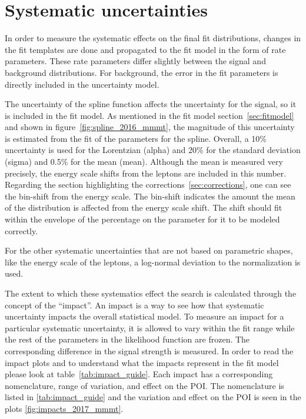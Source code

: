 \section{Systematic uncertainties}
In order to measure the systematic effects on the final fit distributions, changes in the fit templates are done and propagated to the fit model in the form of rate parameters. These rate parameters differ slightly between the signal and background distributions. 
For background, the error in the fit parameters is directly included in the uncertainty model. 

The uncertainty of the spline function affects the uncertainty for the signal, so it is included in the fit model. 
As mentioned in the fit model section~\ref{sec:fitmodel} and shown in figure~\ref{fig:spline_2016_mmmt}, the magnitude of this uncertainty is estimated from the fit of the parameters for the spline. Overall, a 10\% uncertainty is used for the Lorentzian (alpha) and 20\% for the standard deviation (sigma) and 0.5\% for the mean (mean). Although the mean is measured very precisely, the energy scale shifts from the leptons are included in this number. Regarding the section highlighting the corrections~\ref{sec:corrections}, one can see the bin-shift from the energy scale. The bin-shift indicates the amount the mean of the distribution is affected from the energy scale shift. The shift should fit within the envelope of the percentage on the parameter for it to be modeled correctly.


For the other systematic uncertainties that are not based on parametric shapes, like the energy scale of the leptons, a log-normal deviation to the normalization is used. 

The extent to which these systematics effect the search is calculated through the concept of the ``impact''. An impact is a way to see how that systematic uncertainty impacts the overall statistical model. To measure an impact for a particular systematic uncertainty, it is allowed to vary within the fit range while the rest of the parameters in the likelihood function are frozen. The corresponding difference in the signal strength is measured. 
In order to read the impact plots and to understand what the impacts represent in the fit model please look at table~\ref{tab:impact_guide}.
Each impact has a corresponding nomenclature, range of variation, and effect on the POI. The nomenclature is listed in \ref{tab:impact_guide} and the variation and effect on the POI is seen in the plots \ref{fig:impacts_2017_mmmt}.


